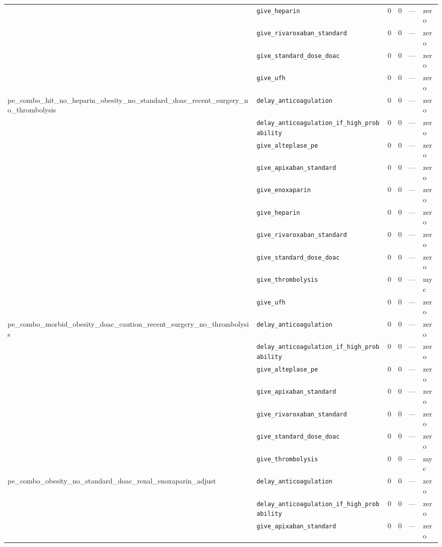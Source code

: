 \begin{table}[ht]
\begin{tabular}{llrrrl}
 & \texttt{give\_heparin} & 0 & 0 & — & zero \\
 & \texttt{give\_rivaroxaban\_standard} & 0 & 0 & — & zero \\
 & \texttt{give\_standard\_dose\_doac} & 0 & 0 & — & zero \\
 & \texttt{give\_ufh} & 0 & 0 & — & zero \\
\midrule
pe\_combo\_hit\_no\_heparin\_obesity\_no\_standard\_doac\_recent\_surgery\_no\_thrombolysis & \texttt{delay\_anticoagulation} & 0 & 0 & — & zero \\
 & \texttt{delay\_anticoagulation\_if\_high\_probability} & 0 & 0 & — & zero \\
 & \texttt{give\_alteplase\_pe} & 0 & 0 & — & zero \\
 & \texttt{give\_apixaban\_standard} & 0 & 0 & — & zero \\
 & \texttt{give\_enoxaparin} & 0 & 0 & — & zero \\
 & \texttt{give\_heparin} & 0 & 0 & — & zero \\
 & \texttt{give\_rivaroxaban\_standard} & 0 & 0 & — & zero \\
 & \texttt{give\_standard\_dose\_doac} & 0 & 0 & — & zero \\
 & \texttt{give\_thrombolysis} & 0 & 0 & — & myc \\
 & \texttt{give\_ufh} & 0 & 0 & — & zero \\
\midrule
pe\_combo\_morbid\_obesity\_doac\_caution\_recent\_surgery\_no\_thrombolysis & \texttt{delay\_anticoagulation} & 0 & 0 & — & zero \\
 & \texttt{delay\_anticoagulation\_if\_high\_probability} & 0 & 0 & — & zero \\
 & \texttt{give\_alteplase\_pe} & 0 & 0 & — & zero \\
 & \texttt{give\_apixaban\_standard} & 0 & 0 & — & zero \\
 & \texttt{give\_rivaroxaban\_standard} & 0 & 0 & — & zero \\
 & \texttt{give\_standard\_dose\_doac} & 0 & 0 & — & zero \\
 & \texttt{give\_thrombolysis} & 0 & 0 & — & myc \\
\midrule
pe\_combo\_obesity\_no\_standard\_doac\_renal\_enoxaparin\_adjust & \texttt{delay\_anticoagulation} & 0 & 0 & — & zero \\
 & \texttt{delay\_anticoagulation\_if\_high\_probability} & 0 & 0 & — & zero \\
 & \texttt{give\_apixaban\_standard} & 0 & 0 & — & zero \\

\end{tabular}
\end{table}

